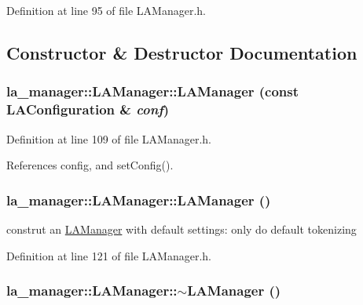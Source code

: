 Definition at line 95 of file LAManager.h.

\subsection{Constructor \& Destructor Documentation}
\hypertarget{classla__manager_1_1LAManager_7066f276279b4dd2cdca28f43d69658c}{
\subsubsection[{LAManager}]{\setlength{\rightskip}{0pt plus 5cm}la\_\-manager::LAManager::LAManager (const {\bf LAConfiguration} \& {\em conf})}}
\label{classla__manager_1_1LAManager_7066f276279b4dd2cdca28f43d69658c}




Definition at line 109 of file LAManager.h.

References config, and setConfig().\hypertarget{classla__manager_1_1LAManager_f941e0e7868031624407c8311443864e}{
\subsubsection[{LAManager}]{\setlength{\rightskip}{0pt plus 5cm}la\_\-manager::LAManager::LAManager ()}}
\label{classla__manager_1_1LAManager_f941e0e7868031624407c8311443864e}


construt an \hyperlink{classla__manager_1_1LAManager}{LAManager} with default settings: only do default tokenizing 



Definition at line 121 of file LAManager.h.\hypertarget{classla__manager_1_1LAManager_d2b2cc43d34abae382c2efb451bc86ae}{
\subsubsection[{$\sim$LAManager}]{\setlength{\rightskip}{0pt plus 5cm}la\_\-manager::LAManager::$\sim$LAManager ()}}
\label{classla__manager_1_1LAManager_d2b2cc43d34abae382c2efb451bc86ae}




